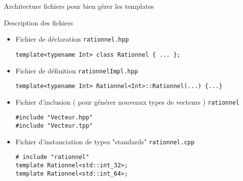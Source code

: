 \documentclass[compress,10pt,aspectratio=169]{beamer}
\begin{document}
\begin{frame}[fragile]{Architecture fichiers pour bien gérer les templates}
  \scriptsize
  \begin{minipage}{0.35\textwidth}
  \end{minipage}\hfill
  \begin{minipage}{0.63\textwidth}
  \begin{block}{\small Description des fichiers}
  \begin{itemize}
  \item Fichier de déclaration \texttt{rationnel.hpp}
\begin{verbatim}
template<typename Int> class Rationnel { ... };
\end{verbatim}
  \item Fichier de définition \texttt{rationnelImpl.hpp}
\begin{verbatim}
template<typename Int> Rationnel<Int>::Rationnel(...) {...}
\end{verbatim}
  \item Fichier d'inclusion ( pour générer nouveaux types de vecteurs ) 
  \texttt{rationnel}
\begin{verbatim}
#include "Vecteur.hpp"
#include "Vecteur.tpp"
\end{verbatim}
\item Fichier d'instanciation de types "standards" \texttt{rationnel.cpp}
\begin{verbatim}
# include "rationnel"
template Rationnel<std::int_32>;
template Rationnel<std::int_64>;
\end{verbatim}
\end{itemize}
\end{block}
\end{minipage}
\end{frame}
\end{document}
